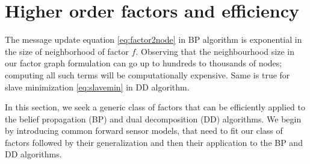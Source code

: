 \documentclass[letterpaper, 10 pt, conference]{ieeeconf} %
\begin{document}

\section{Higher order factors and efficiency}

The message update equation \eqref{eq:factor2node} in BP algorithm is
exponential in the size of neighborhood of factor $f$. Observing that the
neighbourhood size in our factor graph formulation can go up to hundreds to
thousands of nodes; computing all such terms will be computationally
expensive. Same is true for slave minimization \eqref{eq:slavemin} in DD algorithm.

In this section, we seek a generic class of factors that can be 
efficiently applied to the belief propagation (BP) and dual decomposition (DD)
algorithms. We begin by introducing common forward sensor models, that need to
fit our class of factors followed by their generalization and then their 
application to the BP and DD algorithms.
\end{document}

